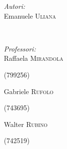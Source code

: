 \documentclass[12pt]{article}
\begin{document}
\begin{titlepage}

\begin{minipage}{0.4\textwidth}
\begin{flushleft} \large
\emph{Autori:}\\
Emanuele \textsc{Uliana} %
\end{flushleft}
\end{minipage}
~
\begin{minipage}{0.4\textwidth}
\begin{flushright} \large
\emph{Professori:} \\
Raffaela \textsc{Mirandola} %
\end{flushright}
\end{minipage}
\begin{minipage}{0.83\textwidth}
\begin{flushleft} \large
\vspace{0,1cm}
\textsc{(799256)} %
\end{flushleft}
\end{minipage}
\begin{minipage}{0.83\textwidth}
\begin{flushleft} \large
\vspace{0,1cm}
Gabriele \textsc{Rufolo} %
\end{flushleft}
\end{minipage}
\begin{minipage}{0.83\textwidth}
\begin{flushleft} \large
\vspace{0,1cm}
\textsc{(743695)} %
\end{flushleft}
\end{minipage}
\begin{minipage}{0.83\textwidth}
\begin{flushleft} \large
\vspace{0,1cm}
Walter \textsc{Rubino} %
\end{flushleft}
\end{minipage}
\begin{minipage}{0.83\textwidth}
\begin{flushleft} \large
\vspace{0,1cm}
\textsc{(742519)} %
\end{flushleft}
\end{minipage}\\[1cm]





\end{titlepage}
\end{document}
